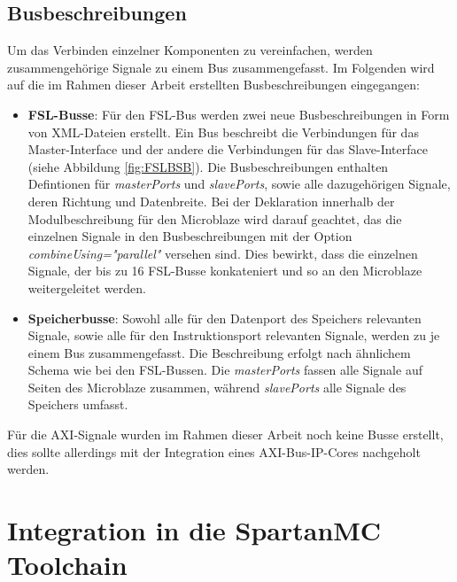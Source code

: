 \subsection{Busbeschreibungen}\label{subsec:BusDesc}
Um das Verbinden einzelner Komponenten zu vereinfachen, werden zusammengehörige Signale zu einem Bus zusammengefasst. Im Folgenden wird auf die im Rahmen dieser Arbeit erstellten Busbeschreibungen eingegangen:
\begin{itemize}
\item \textbf{FSL-Busse}: Für den FSL-Bus werden zwei neue Busbeschreibungen in Form von XML-Dateien erstellt. Ein Bus beschreibt die Verbindungen für das Master-Interface und der andere die Verbindungen für das Slave-Interface (siehe Abbildung \ref{fig:FSLBSB}). Die Busbeschreibungen enthalten Defintionen für \textit{masterPorts} und \textit{slavePorts}, sowie alle dazugehörigen Signale, deren Richtung und Datenbreite.
Bei der Deklaration innerhalb der Modulbeschreibung für den Microblaze wird darauf geachtet, das die einzelnen Signale in den Busbeschreibungen mit der Option \textit{combineUsing="parallel"} versehen sind. Dies bewirkt, dass die einzelnen Signale, der bis zu 16 FSL-Busse konkateniert und so an den Microblaze weitergeleitet werden.
\item \textbf{Speicherbusse}: Sowohl alle für den Datenport des Speichers relevanten Signale, sowie alle für den Instruktionsport relevanten Signale, werden zu je einem Bus zusammengefasst. Die Beschreibung erfolgt nach ähnlichem Schema wie bei den FSL-Bussen. Die \textit{masterPorts} fassen alle Signale auf Seiten des Microblaze zusammen, während \textit{slavePorts} alle Signale des Speichers umfasst.
\end{itemize}
Für die AXI-Signale wurden im Rahmen dieser Arbeit noch keine Busse erstellt, dies sollte allerdings mit der Integration eines AXI-Bus-IP-Cores nachgeholt werden.

\section{Integration in die SpartanMC Toolchain}

